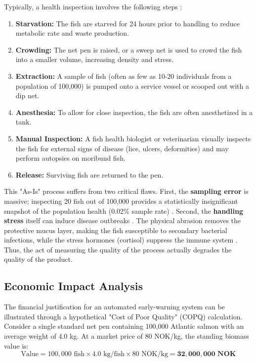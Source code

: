 \documentclass[12pt,a4paper]{article}
\begin{document}
Typically, a health inspection involves the following steps \citep{NVI_2025_NFHR2024}:
\begin{enumerate}
    \item \textbf{Starvation:} The fish are starved for 24 hours prior to handling to reduce metabolic rate and waste production.
    \item \textbf{Crowding:} The net pen is raised, or a sweep net is used to crowd the fish into a smaller volume, increasing density and stress.
    \item \textbf{Extraction:} A sample of fish (often as few as 10-20 individuals from a population of 100,000) is pumped onto a service vessel or scooped out with a dip net.
    \item \textbf{Anesthesia:} To allow for close inspection, the fish are often anesthetized in a tank.
    \item \textbf{Manual Inspection:} A fish health biologist or veterinarian visually inspects the fish for external signs of disease (lice, ulcers, deformities) and may perform autopsies on moribund fish.
    \item \textbf{Release:} Surviving fish are returned to the pen.
\end{enumerate}

This "As-Is" process suffers from two critical flaws. First, the \textbf{sampling error} is massive; inspecting 20 fish out of 100,000 provides a statistically insignificant snapshot of the population health (0.02\% sample rate) \citep{montgomery2020introduction}. Second, the \textbf{handling stress} itself can induce disease outbreaks \citep{Iversen2017}. The physical abrasion removes the protective mucus layer, making the fish susceptible to secondary bacterial infections, while the stress hormones (cortisol) suppress the immune system \citep{Deng2025}. Thus, the act of measuring the quality of the process actually degrades the quality of the product.

\subsection{Economic Impact Analysis}
The financial justification for an automated early-warning system can be illustrated through a hypothetical "Cost of Poor Quality" (COPQ) calculation. Consider a single standard net pen containing 100,000 Atlantic salmon with an average weight of 4.0 kg. At a market price of 80 NOK/kg, the standing biomass value is:
\begin{equation}
    \text{Value} = 100,000 \text{ fish} \times 4.0 \text{ kg/fish} \times 80 \text{ NOK/kg} = \mathbf{32,000,000 \text{ NOK}}
\end{equation}
\end{document}
